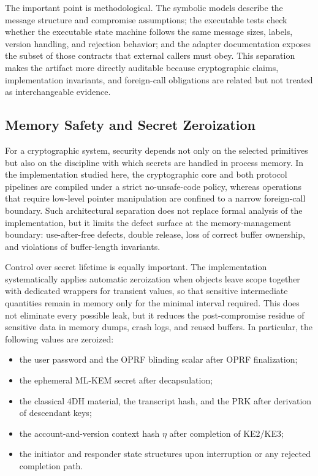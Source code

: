 \documentclass[preprint,12pt]{elsarticle}
\newcommand{\codeid}[1]{\textsf{#1}}
\theoremstyle{remark}
\begin{document}
The important point is methodological. The symbolic models describe the
message structure and compromise assumptions; the executable tests check
whether the executable state machine follows the same message sizes,
labels, version handling, and rejection behavior; and the adapter
documentation exposes the subset of those contracts that external
callers must obey. This separation makes the artifact more directly
auditable because cryptographic claims, implementation invariants, and
foreign-call obligations are
related but not treated as interchangeable evidence.

\subsection{Memory Safety and Secret Zeroization}

For a cryptographic system, security depends not only on the selected
primitives but also on the discipline with which secrets are handled in
process memory. In the implementation studied here, the
cryptographic core and both protocol pipelines are compiled under a
strict no-\codeid{unsafe}-code policy, whereas operations that require
low-level pointer manipulation are confined to a narrow foreign-call boundary.
Such architectural separation does not replace formal analysis of the
implementation, but it limits the defect surface at the
memory-management boundary: use-after-free defects, double release,
loss of correct buffer ownership, and violations of buffer-length
invariants.

Control over secret lifetime is equally important. The
implementation systematically applies automatic zeroization when
objects leave scope together with dedicated wrappers for transient
values, so that sensitive intermediate quantities remain in memory only
for the minimal interval required. This does not eliminate every
possible leak, but it reduces the post-compromise residue of
sensitive data in memory dumps, crash logs, and reused buffers. In particular, the
following values are zeroized:
\begin{itemize}
  \item the user password and the OPRF blinding scalar after OPRF
        finalization;
  \item the ephemeral ML-KEM secret after decapsulation;
  \item the classical 4DH material, the transcript hash, and the PRK
        after derivation of descendant keys;
  \item the account-and-version context hash $\eta$ after completion of
        KE2/KE3;
  \item the initiator and responder state structures upon interruption
        or any rejected completion path.
\end{itemize}
\end{document}
